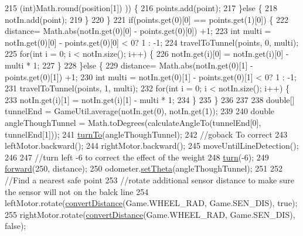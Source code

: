 \begin{DoxyCode}
215                                                                                (int)Math.round(position[1])
      )) \{
216         points.add(point);
217       \}\textcolor{keywordflow}{else} \{
218         notIn.add(point);
219       \}
220     \}
221     \textcolor{keywordflow}{if}(points.get(0)[0] == points.get(1)[0]) \{
222       distance= Math.abs(notIn.get(0)[0] - points.get(0)[0]) +1;
223       \textcolor{keywordtype}{int} multi = notIn.get(0)[0] - points.get(0)[0] < 0? 1 : -1;
224       travelToTunnel(points, 0, multi);
225       \textcolor{keywordflow}{for}(\textcolor{keywordtype}{int} i = 0; i < notIn.size(); i++) \{
226         notIn.get(i)[0] = notIn.get(i)[0] - multi * 1;
227       \}
228     \}\textcolor{keywordflow}{else} \{
229       distance= Math.abs(notIn.get(0)[1] - points.get(0)[1]) +1; 
230       \textcolor{keywordtype}{int} multi = notIn.get(0)[1] - points.get(0)[1] < 0? 1 : -1;
231       travelToTunnel(points, 1, multi);
232       \textcolor{keywordflow}{for}(\textcolor{keywordtype}{int} i = 0; i < notIn.size(); i++) \{
233         notIn.get(i)[1] = notIn.get(i)[1] - multi * 1;
234       \}
235     \}
236     
237    
238     \textcolor{keywordtype}{double}[] tunnelEnd = GameUtil.average(notIn.get(0), notIn.get(1));
239     
240     \textcolor{keywordtype}{double} angleThoughTunnel = Math.toDegrees(calculateAngleTo(tunnelEnd[0], tunnelEnd[1]));
241     \hyperlink{classca_1_1mcgill_1_1ecse211_1_1project_1_1_navigation_a3bbe0645f2b3b3d0986b4a707fb5a00c}{turnTo}(angleThoughTunnel);
242     \textcolor{comment}{//goback To correct}
243     leftMotor.backward();
244     rightMotor.backward();
245     moveUntilLineDetection();
246     
247     \textcolor{comment}{//turn left -6 to correct the effect of the weight}
248     \hyperlink{classca_1_1mcgill_1_1ecse211_1_1project_1_1_navigation_ad74286ad36d333bfaf57661837457b76}{turn}(-6);
249     \hyperlink{classca_1_1mcgill_1_1ecse211_1_1project_1_1_navigation_a7c66610c5b7496ddb35d342ab2cd3f08}{forward}(250, distance);
250     odometer.\hyperlink{classca_1_1mcgill_1_1ecse211_1_1odometer_1_1_odometer_data_a419b8f07c2c5374411c8e62298e9a402}{setTheta}(angleThoughTunnel);
251     
252     \textcolor{comment}{//Find a nearest safe point}
253     \textcolor{comment}{//rotate additional sensor distance to make sure the sensor will not on the balck line}
254     leftMotor.rotate(\hyperlink{classca_1_1mcgill_1_1ecse211_1_1project_1_1_navigation_ac9e260bcd619ffa4820d7d0de7ea1c12}{convertDistance}(Game.WHEEL\_RAD, Game.SEN\_DIS), \textcolor{keyword}{true});
255     rightMotor.rotate(\hyperlink{classca_1_1mcgill_1_1ecse211_1_1project_1_1_navigation_ac9e260bcd619ffa4820d7d0de7ea1c12}{convertDistance}(Game.WHEEL\_RAD, Game.SEN\_DIS), \textcolor{keyword}{false});

\end{DoxyCode}
